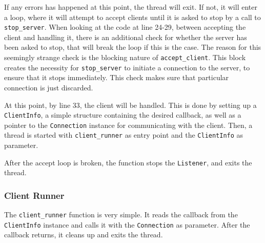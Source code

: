 If any errors has happened at this point, the thread will exit. If not, it will enter a loop, where it will attempt to accept clients until it is asked to stop by a call to \lstinline|stop_server|.
When looking at the code at line 24-29, between accepting the client and handling it, there is an additional check for whether the server has been asked to stop, that will break the loop
if this is the case. The reason for this seemingly strange check is the blocking nature of \lstinline|accept_client|. This block creates the necessity for \lstinline|stop_server| to initiate
a connection to the server, to ensure that it stops immediately. This check makes sure that particular connection is just discarded.

At this point, by line 33, the client will be handled. This is done by setting up a \lstinline|ClientInfo|, a simple structure containing the desired callback,
as well as a pointer to the \lstinline|Connection| instance for communicating with the client.
Then, a thread is started with \lstinline|client_runner| as entry point and the \lstinline|ClientInfo| as parameter.

After the accept loop is broken, the function stops the \lstinline|Listener|, and exits the thread.



\subsubsection{Client Runner}
The \lstinline|client_runner| function is very simple. It reads the callback from the \lstinline|ClientInfo| instance and calls it with the \lstinline|Connection| as parameter.
After the callback returns, it cleans up and exits the thread.
